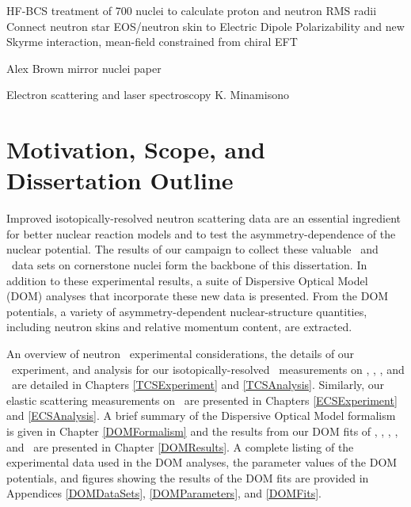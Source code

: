 HF-BCS treatment of 700 nuclei to calculate proton and neutron RMS radii \cite{Angeli1980}
Connect neutron star EOS/neutron skin to Electric Dipole Polarizability and new Skyrme interaction, mean-field
constrained from chiral EFT \cite{Zhang2018}


Alex Brown mirror nuclei paper

Electron scattering and laser spectroscopy
K. Minamisono

\section{Motivation, Scope, and Dissertation Outline}
Improved isotopically-resolved neutron scattering data are an essential ingredient
for better nuclear reaction models and to test the asymmetry-dependence of the
nuclear potential. The results of our campaign to collect these valuable
\tot\ and \el\ data sets on cornerstone nuclei form the backbone of this dissertation.
In addition to these experimental results, a suite of Dispersive Optical Model (DOM) analyses that 
incorporate these new data is presented. From the DOM potentials, a variety of asymmetry-dependent 
nuclear-structure quantities, including neutron skins and relative momentum
content, are extracted.

An overview of neutron \tot\ experimental considerations, the details of our 
\tot\ experiment, and analysis for our isotopically-resolved \tot\ measurements
on \oSixEight, \niEightFour, \rhThree, and \snTwelveFour\ are detailed in 
Chapters \ref{TCSExperiment} and \ref{TCSAnalysis}. Similarly, our elastic scattering measurements 
on \snTwelveFour\ are presented in Chapters \ref{ECSExperiment} and \ref{ECSAnalysis}. A brief 
summary of the Dispersive Optical Model formalism is
given in Chapter \ref{DOMFormalism} and the results from our DOM fits of \oSixEight, 
\caAughtEight, \niEightFour, \snTwelveFour, and \pbEight\ are presented in Chapter \ref{DOMResults}. 
A complete listing of the experimental data used in the DOM analyses, the
parameter values of the DOM potentials, and figures showing the 
results of the DOM fits are provided in Appendices \ref{DOMDataSets},
\ref{DOMParameters}, and \ref{DOMFits}. 
